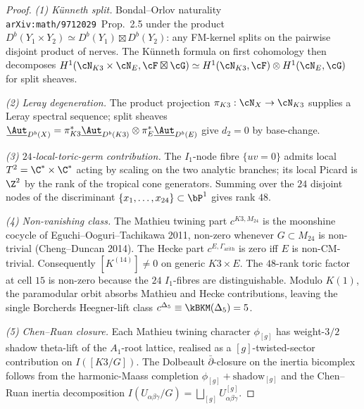 \begin{proof}
\emph{(1) K\"{u}nneth split.} Bondal--Orlov naturality
\texttt{arXiv:math/9712029}~Prop.~2.5 under the product
$D^{b}(Y_{1}\times Y_{2})\simeq D^{b}(Y_{1})\boxtimes D^{b}(Y_{2})$:
any FM-kernel splits on the pairwise disjoint product of nerves. The
K\"{u}nneth formula on first cohomology then decomposes
$H^{1}(\cN_{K3}\times\cN_{E},\cF\boxtimes\cG)\simeq
H^{1}(\cN_{K3},\cF)\otimes H^{1}(\cN_{E},\cG)$ for split sheaves.

\emph{(2) Leray degeneration.} The product projection
$\pi_{K3}:\cN_{X}\to\cN_{K3}$ supplies a Leray spectral sequence;
split sheaves $\underline{\Aut}_{D^{b}(X)} = \pi_{K3}^{*}\underline{\Aut}_{D^{b}(K3)}
\otimes\pi_{E}^{*}\underline{\Aut}_{D^{b}(E)}$
give $d_{2}=0$ by base-change.

\emph{(3) $24$-local-toric-germ contribution.} The $I_{1}$-node fibre
$\{uv=0\}$ admits local $T^{2} = \C^{*}\times\C^{*}$ acting by scaling
on the two analytic branches; its local Picard is $\Z^{2}$ by the
rank of the tropical cone generators. Summing over the $24$ disjoint
nodes of the discriminant $\{x_{1},\ldots,x_{24}\}\subset\bP^{1}$
gives rank $48$.

\emph{(4) Non-vanishing class.} The Mathieu twining part
$c^{K3,M_{24}}$ is the moonshine cocycle of Eguchi--Ooguri--Tachikawa
2011, non-zero whenever $G\subset M_{24}$ is non-trivial (Cheng--Duncan
2014). The Hecke part $c^{E,\Gamma_{\mathrm{arith}}}$ is zero iff $E$
is non-CM-trivial. Consequently $[K^{(14)}]\neq 0$ on generic
$K3 \times E$. The $48$-rank toric factor at cell $15$ is non-zero
because the $24$ $I_{1}$-fibres are distinguishable. Modulo $K(1)$,
the paramodular orbit absorbs Mathieu and Hecke contributions, leaving
the single Borcherds Heegner-lift class
$c^{\Delta_{5}}\equiv\kBKM(\Delta_{5})=5$.

\emph{(5) Chen--Ruan closure.} Each Mathieu twining character
$\phi_{[g]}$ has weight-$3/2$ shadow theta-lift of the $A_{1}$-root
lattice, realised as a $[g]$-twisted-sector contribution on $I([K3/G])$.
The Dolbeault $\bar\partial$-closure on the inertia bicomplex follows
from the harmonic-Maass completion $\phi_{[g]} + \mathrm{shadow}_{[g]}$
and the Chen--Ruan inertia decomposition
$I(U_{\alpha\beta\gamma}/G) = \bigsqcup_{[g]}U_{\alpha\beta\gamma}^{[g]}$.
\end{proof}

